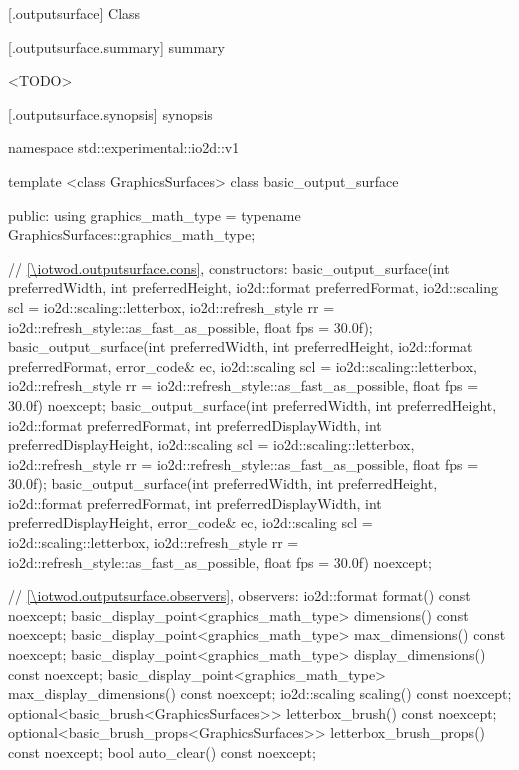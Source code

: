  [\iotwod.outputsurface] {Class }

 [\iotwod.outputsurface.summary] { summary}

\pnum
{}%
<TODO>

 [\iotwod.outputsurface.synopsis] { synopsis}

\begin{codeblock}
namespace std::experimental::io2d::v1 {
  template <class GraphicsSurfaces>
  class basic_output_surface {
  public:
    using graphics_math_type = typename GraphicsSurfaces::graphics_math_type;

    // \ref{\iotwod.outputsurface.cons}, constructors:
    basic_output_surface(int preferredWidth, int preferredHeight, io2d::format preferredFormat,
      io2d::scaling scl = io2d::scaling::letterbox,
      io2d::refresh_style rr = io2d::refresh_style::as_fast_as_possible, float fps = 30.0f);
    basic_output_surface(int preferredWidth, int preferredHeight, io2d::format preferredFormat,
      error_code& ec, io2d::scaling scl = io2d::scaling::letterbox,
      io2d::refresh_style rr = io2d::refresh_style::as_fast_as_possible, float fps = 30.0f)
      noexcept;
    basic_output_surface(int preferredWidth, int preferredHeight, io2d::format preferredFormat,
      int preferredDisplayWidth, int preferredDisplayHeight,
      io2d::scaling scl = io2d::scaling::letterbox,
      io2d::refresh_style rr = io2d::refresh_style::as_fast_as_possible, float fps = 30.0f);
    basic_output_surface(int preferredWidth, int preferredHeight, io2d::format preferredFormat,
      int preferredDisplayWidth, int preferredDisplayHeight, error_code& ec,
      io2d::scaling scl = io2d::scaling::letterbox,
      io2d::refresh_style rr = io2d::refresh_style::as_fast_as_possible, float fps = 30.0f)
      noexcept;
	
    // \ref{\iotwod.outputsurface.observers}, observers:
    io2d::format format() const noexcept;
    basic_display_point<graphics_math_type> dimensions() const noexcept;
    basic_display_point<graphics_math_type> max_dimensions() const noexcept;
    basic_display_point<graphics_math_type> display_dimensions() const noexcept;
    basic_display_point<graphics_math_type> max_display_dimensions() const noexcept;
    io2d::scaling scaling() const noexcept;
    optional<basic_brush<GraphicsSurfaces>> letterbox_brush() const noexcept;
    optional<basic_brush_props<GraphicsSurfaces>> letterbox_brush_props() const noexcept;
    bool auto_clear() const noexcept;

}}
\end{codeblock}
